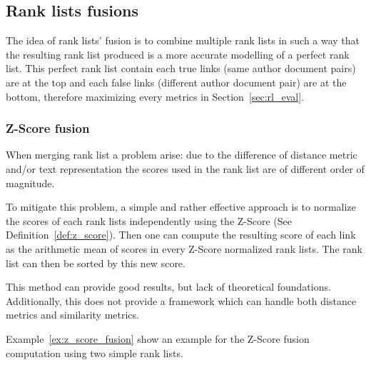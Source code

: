 \subsection{Rank lists fusions}
\label{sec:rank_lists_fusion}

The idea of rank lists' fusion is to combine multiple rank lists in such a way that the resulting rank list produced is a more accurate modelling of a perfect rank list.
This perfect rank list contain each true links (same author document pairs) are at the top and each false links (different author document pair) are at the bottom, therefore maximizing every metrics in Section~\ref{sec:rl_eval}.

\subsubsection{Z-Score fusion}

When merging rank list a problem arise: due to the difference of distance metric and/or text representation the scores used in the rank list are of different order of magnitude.

To mitigate this problem, a simple and rather effective approach is to normalize the scores of each rank lists independently using the Z-Score (See Definition~\ref{def:z_score}).
Then one can compute the resulting score of each link as the arithmetic mean of scores in every Z-Score normalized rank lists.
The rank list can then be sorted by this new score.

This method can provide good results, but lack of theoretical foundations.
Additionally, this does not provide a framework which can handle both distance metrics and similarity metrics.

Example~\ref{ex:z_score_fusion} show an example for the Z-Score fusion computation using two simple rank lists.

